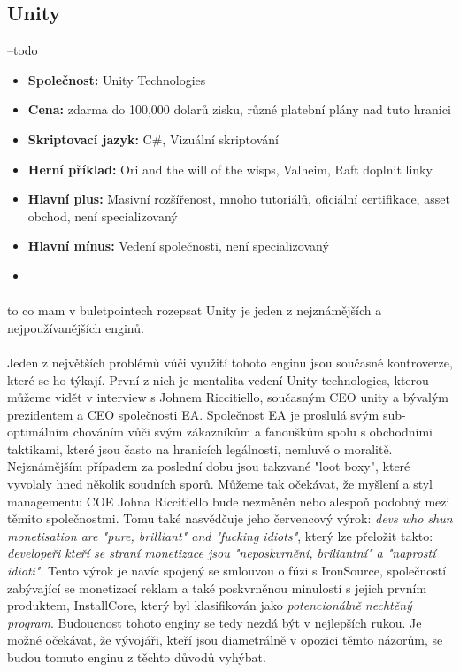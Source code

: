 \subsection{Unity}
	--todo \linebreak
	\begin{itemize}
		\item \textbf{Společnost: } Unity Technologies
		\item \textbf{Cena: } zdarma do 100,000 dolarů zisku, různé platební plány nad tuto hranici\cite{unity_pay_plan}
		\item \textbf{Skriptovací jazyk: } C#, Vizuální skriptování
		\item \textbf{Herní příklad: } Ori and the will of the wisps, Valheim, Raft \todo doplnit linky
		\item \textbf{Hlavní plus: } Masivní rozšířenost, mnoho tutoriálů, oficiální certifikace, asset obchod, není specializovaný
		\item \textbf{Hlavní mínus: } Vedení společnosti, není specializovaný
		\item
	\end{itemize}

\paragraph{} \todo to co mam v buletpointech rozepsat
	Unity\cite{unity_engine} je jeden z nejznámějších a nejpoužívanějších enginů.


\paragraph{}
	Jeden z největších problémů vůči využití tohoto enginu jsou současné kontroverze, které se ho týkají.
	První z nich je mentalita vedení Unity technologies, kterou můžeme vidět v interview s Johnem Riccitiello, současným CEO unity a bývalým prezidentem a CEO společnosti EA.
	Společnost EA je proslulá svým sub-optimálním chováním vůči svým zákazníkům a fanouškům spolu s obchodními taktikami, které jsou často na hranicích legálnosti, nemluvě o moralitě.
	Nejznámějším případem za poslední dobu jsou takzvané "loot boxy"\cite{loot_box_wiki}, které vyvolaly hned několik soudních sporů.
	Můžeme tak očekávat, že myšlení a styl managementu COE Johna Riccitiello bude nezměněn nebo alespoň podobný mezi těmito společnostmi.
	Tomu také nasvědčuje jeho červencový výrok: \textit{devs who shun monetisation are "pure, brilliant" and "fucking idiots"}\cite{John_Riccitiello_interview}, který lze přeložit takto: \textit{developeři kteří se straní monetizace jsou "neposkvrnění, briliantní" a "naprostí idioti"}.
	Tento výrok je navíc spojený se smlouvou o fúzi s IronSource\cite{unity_ironSource_merger}, společností zabývající se monetizací reklam a také poskvrněnou minulostí  s jejich prvním produktem, InstallCore\cite{installCore_wiki}, který byl klasifikován jako \textit{potencionálně nechtěný program}\cite{PUP_wiki}.
	Budoucnost tohoto enginy se tedy nezdá být v nejlepších rukou.
	Je možné očekávat, že vývojáři, kteří jsou diametrálně v opozici těmto názorům, se budou tomuto enginu z těchto důvodů vyhýbat.

